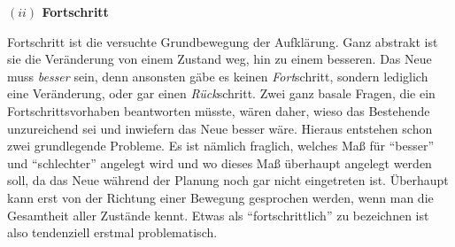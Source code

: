 \documentclass[a4paper, 12pt]{article}
\begin{document}
\begin{onehalfspace}
\vspace{5mm}
\noindent\textbf{$(ii)$ Fortschritt}

\noindent Fortschritt ist die versuchte Grundbewegung der Aufklärung. Ganz abstrakt ist sie die Veränderung von einem Zustand weg, hin zu einem besseren. Das Neue muss \emph{besser} sein, denn ansonsten gäbe es keinen \emph{Fort}schritt, sondern lediglich eine Veränderung, oder gar einen \emph{Rück}schritt. Zwei ganz basale Fragen, die ein Fortschrittsvorhaben beantworten müsste, wären daher, wieso das Bestehende unzureichend sei und inwiefern das Neue besser wäre. Hieraus entstehen schon zwei grundlegende Probleme. Es ist nämlich fraglich, welches Maß für "`besser"' und "`schlechter"' angelegt wird und wo dieses Maß überhaupt angelegt werden soll, da das Neue während der Planung noch gar nicht eingetreten ist. Überhaupt kann erst von der Richtung einer Bewegung gesprochen werden, wenn man die Gesamtheit aller Zustände kennt. Etwas als "`fortschrittlich"' zu bezeichnen ist also tendenziell erstmal problematisch. 


\end{onehalfspace}
\end{document}

